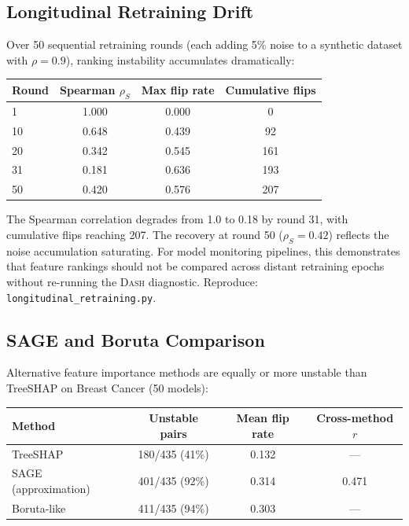 \documentclass{article}
\newcommand{\DASH}{\textsc{Dash}}
\begin{document}
\subsection{Longitudinal Retraining Drift}
\label{sec:longitudinal}

Over 50 sequential retraining rounds (each adding 5\% noise to a synthetic dataset with $\rho{=}0.9$), ranking instability accumulates dramatically:

\begin{center}
\small
\begin{tabular}{@{}lccc@{}}
\toprule
Round & Spearman $\rho_S$ & Max flip rate & Cumulative flips \\
\midrule
1   & 1.000 & 0.000 & 0 \\
10  & 0.648 & 0.439 & 92 \\
20  & 0.342 & 0.545 & 161 \\
31  & 0.181 & 0.636 & 193 \\
50  & 0.420 & 0.576 & 207 \\
\bottomrule
\end{tabular}
\end{center}

The Spearman correlation degrades from 1.0 to 0.18 by round 31, with cumulative flips reaching 207. The recovery at round 50 ($\rho_S{=}0.42$) reflects the noise accumulation saturating. For model monitoring pipelines, this demonstrates that feature rankings should not be compared across distant retraining epochs without re-running the \DASH{} diagnostic.
Reproduce: \texttt{longitudinal\_retraining.py}.

\subsection{SAGE and Boruta Comparison}
\label{sec:sage-comparison}

Alternative feature importance methods are equally or more unstable than TreeSHAP on Breast Cancer (50 models):

\begin{center}
\small
\begin{tabular}{@{}lccc@{}}
\toprule
Method & Unstable pairs & Mean flip rate & Cross-method $r$ \\
\midrule
TreeSHAP             & 180/435 (41\%) & 0.132 & --- \\
SAGE (approximation) & 401/435 (92\%) & 0.314 & 0.471 \\
Boruta-like          & 411/435 (94\%) & 0.303 & --- \\
\bottomrule
\end{tabular}
\end{center}
\end{document}
